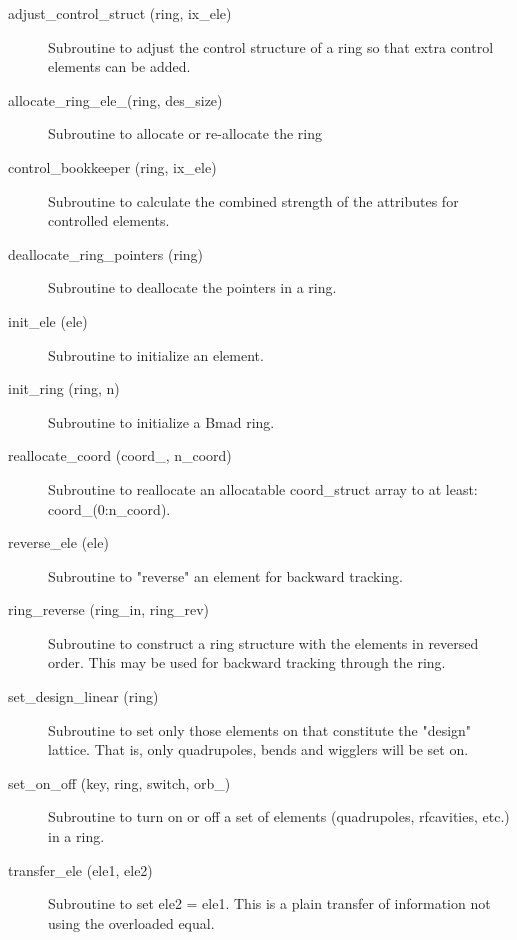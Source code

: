 \begin{description}

\item[adjust\_control\_struct (ring, ix\_ele)] \Newline
Subroutine to adjust the control structure of a ring so that 
extra control elements can be added. 

\item[allocate\_ring\_ele\_(ring, des\_size)] \Newline 
     Subroutine to allocate or re-allocate the ring%

\item[control\_bookkeeper (ring, ix\_ele)] \Newline
Subroutine to calculate the combined strength of the attributes for
controlled elements.

\item[deallocate\_ring\_pointers (ring)] \Newline 
     Subroutine to deallocate the pointers in a ring.

\item[init\_ele (ele)] \Newline
Subroutine to initialize an element. 

\item[init\_ring (ring, n)] \Newline 
     Subroutine to initialize a Bmad ring.

\item[reallocate\_coord (coord\_, n\_coord)] \Newline 
Subroutine to reallocate an allocatable  coord\_struct array to at least:
coord\_(0:n\_coord).

\item[reverse\_ele (ele)] \Newline
Subroutine to "reverse" an element for backward tracking. 

\item[ring\_reverse (ring\_in, ring\_rev)] \Newline
Subroutine to construct a ring structure with the elements in reversed 
order. This may be used for backward tracking through the ring. 

\item[set\_design\_linear (ring)] \Newline
Subroutine to set only those elements on that constitute the "design" 
lattice. That is, only quadrupoles, bends and wigglers will be set on. 

\item[set\_on\_off (key, ring, switch, orb\_)] \Newline
Subroutine to turn on or off a set of elements (quadrupoles,
rfcavities, etc.) in a ring.

\item[transfer\_ele (ele1, ele2)] \Newline 
     Subroutine to set ele2 = ele1. 
     This is a plain transfer of information not using the overloaded equal.


\end{description}
